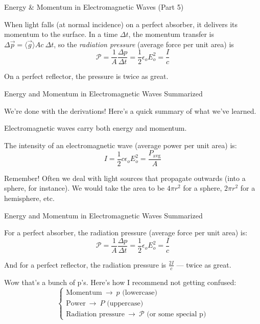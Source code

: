 \documentclass{beamer}
\begin{document}
\begin{frame}{Energy \& Momentum in Electromagnetic Waves (Part 5)}

When light falls (at normal incidence) on a perfect absorber, it delivers its momentum to the surface. In a time $\Delta t$, the momentum transfer is $\Delta \vec{p} = \langle \vec{g} \rangle A c\ \Delta t$, so the \emph{radiation pressure} (average force per unit area) is
\begin{equation*}
    \mathscr{P} = \frac{1}{A} \frac{\Delta p}{\Delta t} = \frac{1}{2} \epsilon_o E_o^2 = \frac{I}{c}
\end{equation*}

On a perfect reflector, the pressure is twice as great.

\end{frame}

\begin{frame}{Energy and Momentum in Electromagnetic Waves Summarized}


We're done with the derivations! Here's a quick summary of what we've learned.

\vfill

Electromagnetic waves carry both energy and momentum.

\vfill

The intensity of an electromagnetic wave (average power per unit area) is:
\begin{equation*}
    I = \frac{1}{2} c \epsilon_o E_o^2 = \frac{P_{\text{avg}}}{A}
\end{equation*}

Remember! Often we deal with light sources that propagate outwards (into a sphere, for instance). We would take the area to be $4\pi r^2$ for a sphere, $2\pi r^2$ for a hemisphere, etc.

\end{frame}

\begin{frame}{Energy and Momentum in Electromagnetic Waves Summarized}

For a perfect absorber, the radiation pressure (average force per unit area) is:
\begin{equation*}
    \mathscr{P} = \frac{1}{A} \frac{\Delta p}{\Delta t} = \frac{1}{2} \epsilon_o E_o^2 = \frac{I}{c}
\end{equation*}

And for a perfect reflector, the radiation pressure is $\frac{2I}{c}$ --- twice as great.

\vfill

Wow that's a bunch of p's. Here's how I recommend not getting confused:
\begin{equation*}
    \begin{cases} \text{Momentum} \ \to \ p \text{ (lowercase)} \\ \text{Power} \ \to \ P \text{ (uppercase)} \\ \text{Radiation pressure} \ \to \ \mathscr{P} \text{ (or some special p)} \end{cases}
\end{equation*}

\end{frame}
\end{document}

